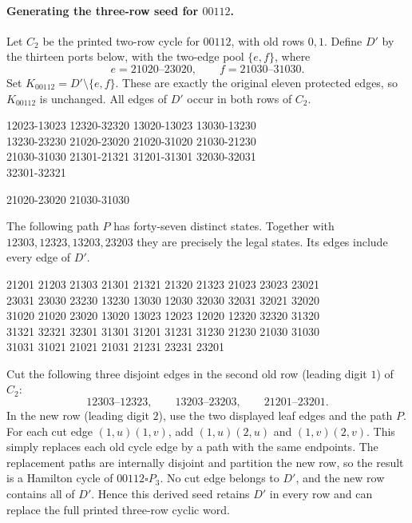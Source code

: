 \paragraph{Generating the three-row seed for $00112$.}
Let $C_2$ be the printed two-row cycle for $00112$, with old rows
$0,1$. Define $D'$ by the thirteen ports below, with the two-edge pool
$\{e,f\}$, where
\[
e=21020\text{--}23020,\qquad f=21030\text{--}31030.
\]
Set $K_{00112}=D'\setminus\{e,f\}$. These are exactly the original
eleven protected edges, so $K_{00112}$ is unchanged. All edges of
$D'$ occur in both rows of $C_2$.

\begingroup\small\ttfamily\begin{flushleft}
12023-13023 12320-32320 13020-13023 13030-13230\\
13230-23230 21020-23020 21020-31020 21030-21230\\
21030-31030 21301-21321 31201-31301 32030-32031\\
32301-32321\\
\end{flushleft}\endgroup
\begingroup\small\ttfamily\begin{flushleft}
21020-23020 21030-31030\\
\end{flushleft}\endgroup

The following path $P$ has forty-seven distinct states. Together
with $12303,12323,13203,23203$ they are precisely the legal states.
Its edges include every edge of $D'$.
\begingroup\small\ttfamily\begin{flushleft}
21201 21203 21303 21301 21321 21320 21323 21023 23023 23021\\
23031 23030 23230 13230 13030 12030 32030 32031 32021 32020\\
31020 21020 23020 13020 13023 12023 12020 12320 32320 31320\\
31321 32321 32301 31301 31201 31231 31230 21230 21030 31030\\
31031 31021 21021 21031 21231 23231 23201
\end{flushleft}\endgroup

Cut the following three disjoint edges in the second old row
(leading digit $1$) of $C_2$:
\[
12303\text{--}12323,\qquad
13203\text{--}23203,\qquad
21201\text{--}23201.
\]
In the new row (leading digit $2$), use the two displayed leaf edges
and the path $P$.
For each cut edge $(1,u)(1,v)$, add $(1,u)(2,u)$ and $(1,v)(2,v)$.
This simply replaces each old cycle edge by a path with the same
endpoints. The replacement paths are internally disjoint and
partition the new row, so the result is a Hamilton cycle of
$00112\square P_3$. No cut edge belongs to $D'$, and the new row
contains all of $D'$. Hence this derived seed retains $D'$ in every
row and can replace the full printed three-row cyclic word.

